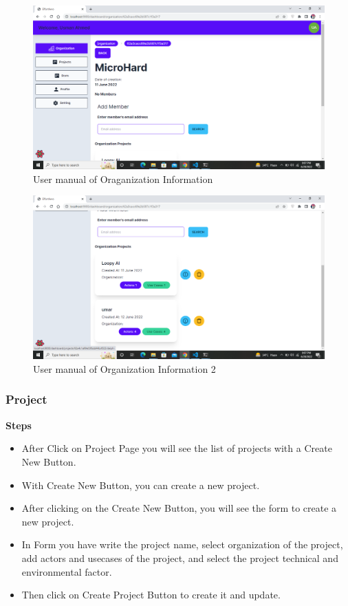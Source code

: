 \begin{figure}[H]
    \centering
    \includegraphics[scale=0.4]{./diagrams/user-manual/Screenshot (20).png}
    \caption{User manual of Oraganization Information}
    \label{fig:user-1}

\end{figure}

\begin{figure}[H]
    \centering
    \includegraphics[scale=0.4]{./diagrams/user-manual/Screenshot (21).png}
    \caption{User manual of Organization Information 2}
    \label{fig:user-1}

\end{figure}

\subsubsection{Project}
\textbf{Steps}
\begin{itemize}
    \item After Click on Project Page you will see the list of projects with a Create New Button.
    \item With Create New Button, you can create a new project.
    \item After clicking on the Create New Button, you will see the form to create a new project.
    \item In Form you have write the project name, select organization of the project, add actors and usecases of the project, and select the project technical and environmental factor.
    \item Then click on Create Project Button to create it and update.
\end{itemize}

